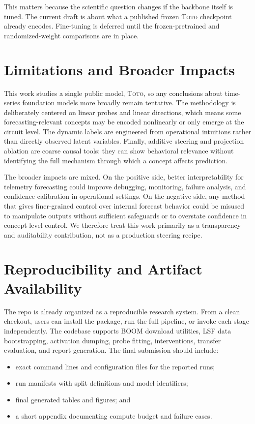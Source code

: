 \documentclass{article}
\newcommand{\model}{\textsc{Toto}}
\newcommand{\boom}{\textsc{BOOM}}
\newcommand{\lsf}{\textsc{LSF}}
\begin{document}
This matters because the scientific question changes if the backbone itself is tuned. The current draft is about what a published frozen \model{} checkpoint already encodes. Fine-tuning is deferred until the frozen-pretrained and randomized-weight comparisons are in place.

\section{Limitations and Broader Impacts}

This work studies a single public model, \model{}, so any conclusions about time-series foundation models more broadly remain tentative. The methodology is deliberately centered on linear probes and linear directions, which means some forecasting-relevant concepts may be encoded nonlinearly or only emerge at the circuit level. The dynamic labels are engineered from operational intuitions rather than directly observed latent variables. Finally, additive steering and projection ablation are coarse causal tools: they can show behavioral relevance without identifying the full mechanism through which a concept affects prediction.

The broader impacts are mixed. On the positive side, better interpretability for telemetry forecasting could improve debugging, monitoring, failure analysis, and confidence calibration in operational settings. On the negative side, any method that gives finer-grained control over internal forecast behavior could be misused to manipulate outputs without sufficient safeguards or to overstate confidence in concept-level control. We therefore treat this work primarily as a transparency and auditability contribution, not as a production steering recipe.

\section{Reproducibility and Artifact Availability}

The repo is already organized as a reproducible research system. From a clean checkout, users can install the package, run the full pipeline, or invoke each stage independently. The codebase supports \boom{} download utilities, \lsf{} data bootstrapping, activation dumping, probe fitting, interventions, transfer evaluation, and report generation. The final submission should include:
\begin{itemize}[leftmargin=18pt]
\item exact command lines and configuration files for the reported runs;
\item run manifests with split definitions and model identifiers;
\item final generated tables and figures; and
\item a short appendix documenting compute budget and failure cases.
\end{itemize}
\end{document}
